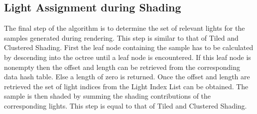 
\subsection{Light Assignment during Shading}

The final step of the algorithm is to determine the set of relevant lights for the samples
generated during rendering. This step is similar to that of Tiled and Clustered Shading.
First the leaf node containing the sample has to be calculated by descending into
the octree until a leaf node is encountered. If this leaf node is nonempty then the
offset and length can be retrieved from the corresponding data hash table. Else a length of
zero is returned. Once the offset and length are retrieved the set of light indices
from the Light Index List can be obtained. The sample is then shaded by summing the
shading contributions of the corresponding lights. This step is equal to that of
Tiled and Clustered Shading.




